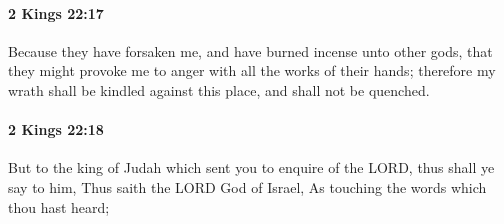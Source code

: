		\paragraph{2 Kings 22:17} %
			\label{2KINGS-22-17}

			Because they have forsaken me, and have burned incense unto other gods, that they might provoke me to anger with all the works of their hands; therefore my wrath shall be kindled against this place, and shall not be quenched.


		\paragraph{2 Kings 22:18} %
			\label{2KINGS-22-18}

			But to the king of Judah which sent you to enquire of the LORD, thus shall ye say to him, Thus saith the LORD God of Israel, As touching the words which thou hast heard;

